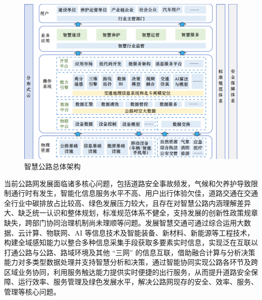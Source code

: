 \documentclass[12pt,hyperref,a4paper,UTF8]{ctexart}
\begin{document}
\begin{sloppypar}
\begin{figure}[!htbp]
    \centering
    \includegraphics[width =.6\textwidth]{figures/智慧公路总体架构.png}
    \caption{智慧公路总体架构}
    \label{framework}
\end{figure}

当前公路网发展面临诸多核心问题，包括道路安全事故频发，气候和欠养护导致限制通行时有发生，智能化信息服务水平不高、用户出行体验欠佳，道路交通在交通全行业中碳排放占比较高、绿色发展压力较大，且存在对智慧公路内涵理解差异大、缺乏统一认识和整体规划，标准规范体系不健全，支持发展的创新性政策规章缺失，跨部门协同治理机制尚未理顺等问题。发展智慧交通可通过综合运用大数据、云计算、物联网、AI 等信息技术及智能装备、新材料、新能源等工程技术，构建全域感知能力以整合多种信息采集手段获取多要素实时信息，实现泛在互联以打通公路与公路、路域环境及其他 “三网” 的信息互联，借助融合计算与分析决策能力对多类型数据处理并支持智慧分析和决策，通过智能协同实现公路各环节及跨区域业务协同，利用服务触达能力提供实时便捷的出行服务，从而提升道路安全保障、运行效率、服务管理及绿色发展水平，解决公路网现存的安全、效率、服务、管理等核心问题。





\end{sloppypar}
\end{document}
